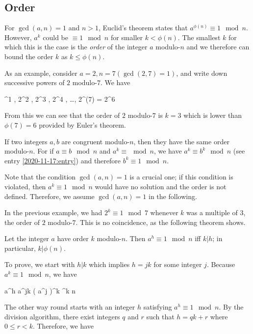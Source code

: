 
\subsection{Order}

For $\gcd(a,n)=1$ and $n > 1$, Euclid's theorem states that $a^{\phi(n)} \equiv 1 \mod n$. However, $a^k$ could be $\equiv 1 \mod n$ for smaller $k < \phi(n)$. The smallest $k$ for which this is the case is the \emph{order} of the integer $a$ modulo-$n$ and we therefore can bound the order $k$ as $k \leq \phi(n)$.

As an example, consider $a = 2, n = 7 (\gcd(2,7)=1)$, and write down successive powers of $2$ modulo-$7$. We have

^1  , 2^2  , 2^3  , 2^4  , \ldots, 2^{\phi(7)} = 2^6  
\eee

From this we can see that the order of $2$ modulo-$7$ is $k=3$ which is lower than $\phi(7) = 6$ provided by Euler's theorem.

If two integers $a, b$ are congruent modulo-$n$, then they have the same order modulo-$n$. For if $a \equiv b \mod n$ and $a^k \equiv \mod n$, we have $a^k \equiv b^k \mod n$ (see entry \ref{2020-11-17:entry}) and therefore $b^k \equiv 1 \mod n$.

Note that the condition $\gcd(a,n)=1$ is a crucial one; if this condition is violated, then $a^k \equiv 1 \mod n$ would have no solution and the order is not defined. Therefore, we assume $\gcd(a,n)=1$ in the following.

In the previous example, we had $2^k \equiv 1 \mod 7$ whenever $k$ was a multiple of $3$, the order of $2$ modulo-$7$. This is no coincidence, as the following theorem shows.

\begin{theorem}
  Let the integer $a$ have order $k$ modulo-$n$. Then $a^h \equiv 1 \mod n$ iff $k | h$; in particular, $k | \phi(n)$.
\end{theorem}

To prove, we start with $h | k$ which implies $h = jk$ for some integer $j$. Because $a^k \equiv 1 \mod n$, we have

\bee
a^h \equiv a^{jk} \equiv \left( a^j \right)^k ^k  \mod n
\eee

The other way round starts with an integer $h$ satisfying $a^h \equiv 1 \mod n$. By the division algorithm, there exist integers $q$ and $r$ such that $h = qk+r$ where $0 \leq r < k$. Therefore, we have

